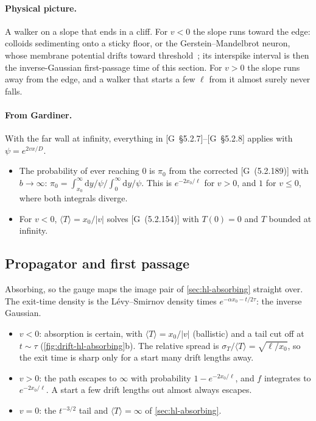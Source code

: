 \documentclass[11pt]{article}
\numberwithin{equation}{section}
\newcommand{\dd}{\mathrm{d}}
\newcommand{\avg}[1]{\langle #1\rangle}
\newcommand{\G}[1]{[G~(#1)]}
\newcommand{\Gs}[1]{[G~\S#1]}
\begin{document}
\paragraph{Physical picture.} A walker on a slope that ends in a cliff. For $v<0$ the slope runs toward the
edge: colloids sedimenting onto a sticky floor, or the Gerstein--Mandelbrot neuron, whose membrane potential drifts
toward threshold~\cite{gerstein}; its interspike interval is then the inverse-Gaussian first-passage time of this
section. For $v>0$ the slope runs away from the edge, and a walker that starts a few $\ell$ from it almost surely
never falls.

\paragraph{From Gardiner.} With the far wall at infinity, everything in \Gs{5.2.7}--\Gs{5.2.8} applies with
$\psi=e^{2vx/D}$.
\begin{itemize}
  \item The probability of ever reaching $0$ is $\pi_0$ from the corrected \G{5.2.189} with $b\to\infty$:
        $\pi_0=\int_{x_0}^\infty\dd y/\psi\big/\int_0^\infty\dd y/\psi$. This is $e^{-2x_0/\ell}$ for $v>0$, and
        $1$ for $v\le0$, where both integrals diverge.
  \item For $v<0$, $\avg T=x_0/|v|$ solves \G{5.2.154} with $T(0)=0$ and $T$ bounded at infinity.
\end{itemize}

\subsection{Propagator and first passage}

Absorbing, so the gauge maps the image pair of \cref{sec:hl-absorbing} straight over. The exit-time density
is the L\'evy--Smirnov density times $e^{-\alpha x_0-t/2\tau}$: the inverse Gaussian.
\begin{itemize}
  \item $v<0$: absorption is certain, with $\avg T=x_0/|v|$ (ballistic) and a tail cut off at $t\sim\tau$
        (\cref{fig:drift-hl-absorbing}b). The relative spread is $\sigma_T/\avg T=\sqrt{\ell/x_0}$, so the
        exit time is sharp only for a start many drift lengths away.
  \item $v>0$: the path escapes to $\infty$ with probability $1-e^{-2x_0/\ell}$, and $f$ integrates to
        $e^{-2x_0/\ell}$. A start a few drift lengths out almost always escapes.
  \item $v=0$: the $t^{-3/2}$ tail and $\avg T=\infty$ of \cref{sec:hl-absorbing}.
\end{itemize}
\end{document}
